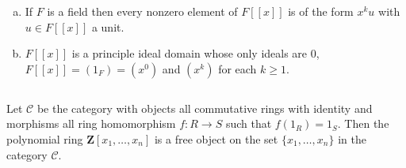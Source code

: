 $$ $$

\begin{ex}
    \begin{enumerate}[(a)]
        \item If $F$ is a field then every nonzero element of $F[[x]]$ is of the form $x^{k}u$ with $u\in F[[x]]$ a unit.
        \item $F[[x]]$ is a principle ideal domain whose only ideals are 0, $F[[x]]=(1_{F})=(x^{0})$ and $(x^{k})$ for each $k\geq 1$.
    \end{enumerate}
\end{ex}

$$ $$

\begin{ex}
    Let $\mathcal{C}$ be the category with objects all commutative rings with identity and morphisms all ring homomorphism $f:R\to S$ such that $f(1_{R})=1_{S}$. Then the polynomial ring $\mathbf{Z}[x_{1},\dots,x_{n}]$ is a free object on the set $\{x_{1},\dots,x_{n}\}$ in the category $\mathcal{C}$.
\end{ex}